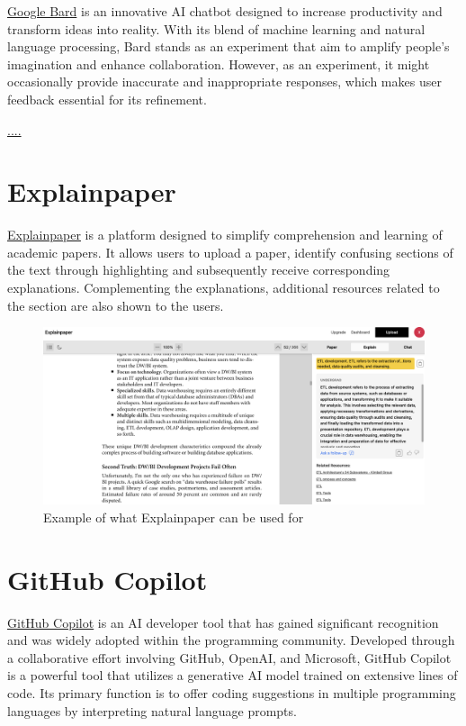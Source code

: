 \documentclass[
]{book}
\begin{document}
\href{https://bard.google.com/}{Google Bard} is an innovative AI chatbot designed to increase productivity and transform ideas into reality. With its blend of machine learning and natural language processing, Bard stands as an experiment that aim to amplify people's imagination and enhance collaboration. However, as an experiment, it might occasionally provide inaccurate and inappropriate responses, which makes user feedback essential for its refinement.

\url{....}

\hypertarget{explainpaper}{%
\section{Explainpaper}\label{explainpaper}}

\href{https://www.explainpaper.com/}{Explainpaper} is a platform designed to simplify comprehension and learning of academic papers. It allows users to upload a paper, identify confusing sections of the text through highlighting and subsequently receive corresponding explanations. Complementing the explanations, additional resources related to the section are also shown to the users.

\begin{figure}

{\centering \includegraphics[width=0.9\linewidth]{Explainpaper_Example} 

}

\caption{Example of what Explainpaper can be used for}\label{fig:unnamed-chunk-9}
\end{figure}

\hypertarget{github-copilot}{%
\section{GitHub Copilot}\label{github-copilot}}

\href{https://github.com/features/copilot}{GitHub Copilot} is an AI developer tool that has gained significant recognition and was widely adopted within the programming community. Developed through a collaborative effort involving GitHub, OpenAI, and Microsoft, GitHub Copilot is a powerful tool that utilizes a generative AI model trained on extensive lines of code. Its primary function is to offer coding suggestions in multiple programming languages by interpreting natural language prompts.
\end{document}

